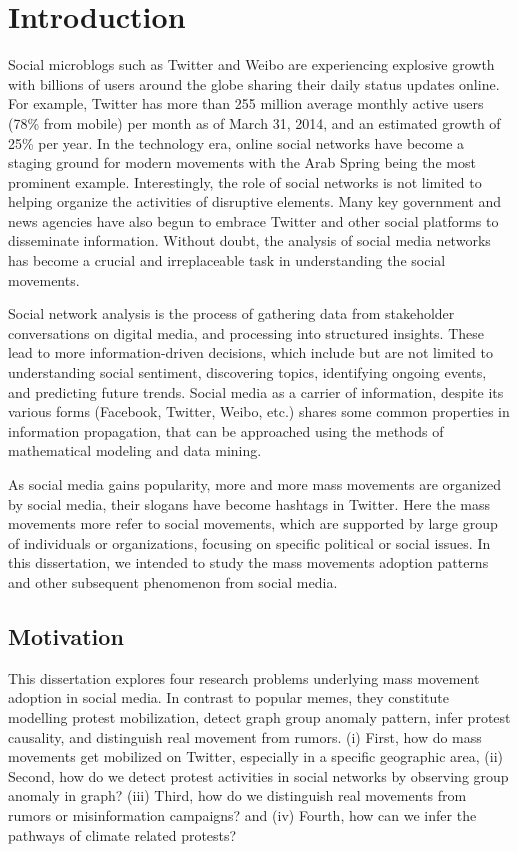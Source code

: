 \chapter{Introduction}
Social microblogs such as Twitter and Weibo are experiencing explosive growth with billions of users around the globe sharing their daily status updates online. For example, Twitter has more than 255 million average monthly active users (78\% from mobile) per month as of March 31, 2014, and an estimated growth of 25\% per year. In the technology era, online social networks have become a staging ground for modern movements with the Arab Spring being the most prominent example. Interestingly, the role of social networks is not limited to helping organize the activities of disruptive elements. Many key government and news agencies have also begun to embrace Twitter and other social platforms to disseminate information. Without doubt, the analysis of social media networks has become a crucial and irreplaceable task in understanding the social movements.

Social network analysis is the process of gathering data from stakeholder conversations on digital media, and processing into structured insights. These lead to more information-driven decisions, which include but are not limited to understanding social sentiment, discovering topics, identifying ongoing events, and predicting future trends. Social media as a carrier of information, despite its various forms (Facebook, Twitter, Weibo, etc.)
shares some common properties in information propagation, that can be approached
using the methods of mathematical modeling and data mining.

As social media gains popularity, more and more mass movements are organized by social media, their slogans have become hashtags in Twitter. Here the mass movements more refer to social movements, which are supported by large group of individuals or organizations, focusing on specific political or social issues. In this dissertation, we intended to study the mass movements adoption patterns and other subsequent phenomenon from social media.






\section{Motivation}
 This dissertation explores four research problems underlying mass movement adoption in social media. In contrast to popular memes, they constitute modelling protest mobilization, detect graph group anomaly pattern, infer protest causality, and distinguish real movement from rumors.
(i) First, how do mass movements get mobilized on Twitter, especially in a specific geographic area,
(ii) Second, how do we detect protest activities in social networks by observing group anomaly in graph?
(iii) Third, how do we distinguish real movements from rumors or misinformation campaigns?
and (iv) Fourth, how can we infer the pathways of climate related protests?
\\

